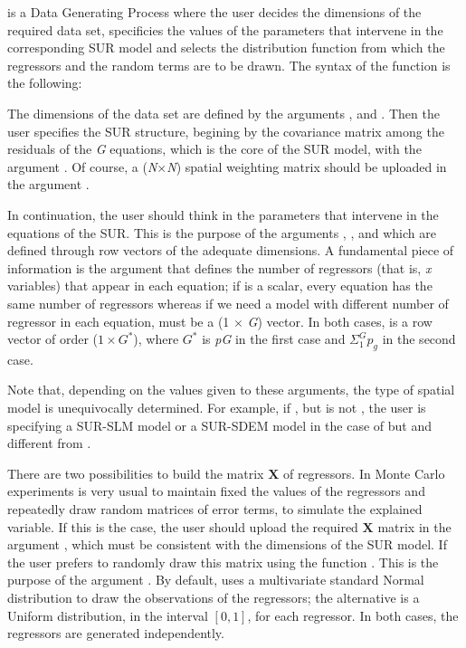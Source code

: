 \documentclass[article]{jss}
\begin{document}
 is a Data Generating Process where the user decides the dimensions of the required data set, specificies the values of the parameters that intervene in the corresponding SUR model and selects the distribution function from which the regressors and the random terms are to be drawn. The syntax of the function is the following:


The dimensions of the data set are defined by the arguments ,  and . Then the user specifies the SUR structure, begining by the covariance matrix among the residuals of the \emph{G} equations, which is the core of the SUR model, with the argument . Of course, a (\emph{N}\(\times\)\emph{N}) spatial weighting matrix should be uploaded in the argument .

In continuation, the user should think in the parameters that intervene in the equations of the SUR. This is the purpose of the arguments , ,  and  which are defined through row vectors of the adequate dimensions. A fundamental piece of information is the argument  that defines the number of regressors (that is, \emph{x} variables) that appear in each equation; if  is a scalar, every equation has the same number of regressors whereas if we need a model with different number of regressor in each equation,  must be a (1 \(\times\) \emph{G}) vector. In both cases,  is a row vector of order (\(1 \times G^{*}\)), where \(G^{*}\) is \emph{pG} in the first case and \(\Sigma_{1}^{G}p_g\) in the second case.

Note that, depending on the values given to these arguments, the type of spatial model is unequivocally determined. For example, if ,  but  is not , the user is specifying a SUR-SLM model or a SUR-SDEM model in the case of  but  and  different from .

There are two possibilities to build the matrix \(\textbf{X}\) of regressors. In Monte Carlo experiments is very usual to maintain fixed the values of the regressors and repeatedly draw random matrices of error terms, to simulate the explained variable. If this is the case, the user should upload the required \(\textbf{X}\) matrix in the argument , which must be consistent with the dimensions of the SUR model. If  the user prefers to randomly draw this matrix using the function . This is the purpose of the argument . By default,  uses a multivariate standard Normal distribution to draw the observations of the regressors; the alternative is a Uniform distribution, in the interval \(\left[0,1\right]\), for each regressor. In both cases, the regressors are generated independently.
\end{document}
